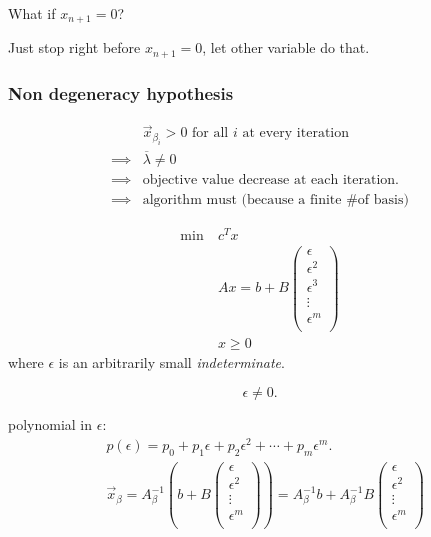 \begin{problem}
What if \(x_{n+1} = 0\)?
\end{problem}
\begin{intuition}
	Just stop right before \(x_{n+1} = 0\), let other variable do that.
\end{intuition}

\subsubsection{Non degeneracy hypothesis}
\[
	\begin{split}
		&\vec{x}_{\beta_i} > 0 \text{ for all \(i\) at every iteration}\\
		\implies &\overline{\lambda} \neq 0\\
		\implies &\text{objective value decrease at each iteration.}\\
		\implies &\text{algorithm must (because a finite \# of basis)}
	\end{split}
\]

\begin{align*}
	\min~ & c^T x                                \\
	      & Ax = b + B\begin{pmatrix}
		\epsilon   \\
		\epsilon^2 \\
		\epsilon^3 \\
		\vdots     \\
		\epsilon^m \\
	\end{pmatrix} \\
	      & x\geq 0
\end{align*}
where \(\epsilon \) is an arbitrarily small \emph{indeterminate}.
\begin{remark}
	\[
		\epsilon \neq 0.
	\]
\end{remark}

\begin{observe}
	polynomial in \(\epsilon \):
	\[
		\begin{split}
			&p(\epsilon) = p_0 + p_1\epsilon + p_2 \epsilon^2 + \cdots + p_{m}\epsilon^m.	\\
			&\vec{x}_{\beta} = A^{-1}_{\beta}\left(b + B\begin{pmatrix}
					\epsilon   \\
					\epsilon^2 \\
					\vdots     \\
					\epsilon^m \\
				\end{pmatrix}\right) = A^{-1}_{\beta}b + A^{-1}_{\beta}B\begin{pmatrix}
				\epsilon   \\
				\epsilon^2 \\
				\vdots     \\
				\epsilon^m \\
			\end{pmatrix}
		\end{split}
	\]
\end{observe}

